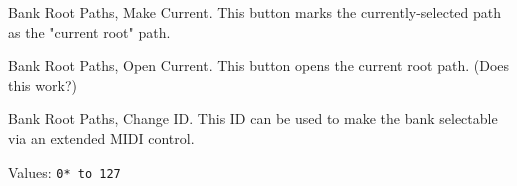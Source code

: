    Bank Root Paths, Make Current.
   This button marks the currently-selected path as the "current root" path.

   Bank Root Paths, Open Current.
   This button opens the current root path.
   (Does this work?)

   Bank Root Paths, Change ID.
   This ID can be used to make the bank selectable via an extended MIDI
   control.

   Values: \texttt{0* to 127}


